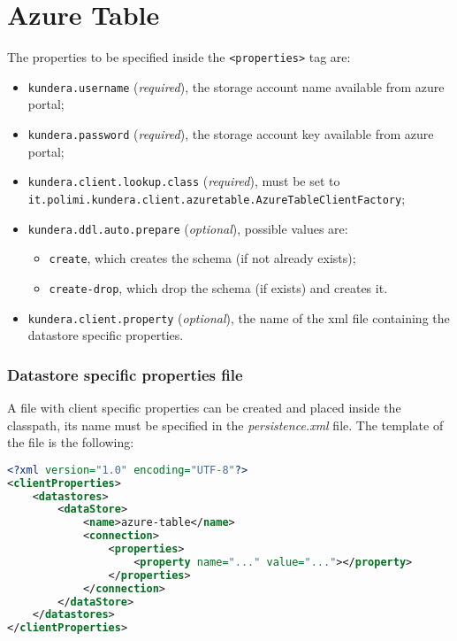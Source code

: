 \section{Azure Table}
\label{appendix:table-config}
The properties to be specified inside the \texttt{<properties>} tag are:
\begin{itemize}
\item \texttt{kundera.username} (\textit{required}), the storage account name available from azure portal;
\item \texttt{kundera.password} (\textit{required}), the storage account key available from azure portal;
\item \texttt{kundera.client.lookup.class} (\textit{required}), must be set to\\\texttt{it.polimi.kundera.client.azuretable.AzureTableClientFactory};
\item \texttt{kundera.ddl.auto.prepare} (\textit{optional}), possible values are:
\begin{itemize}
\item \texttt{create}, which creates the schema (if not already exists);
\item \texttt{create-drop}, which drop the schema (if exists) and creates it.
\end{itemize}
\item \texttt{kundera.client.property} (\textit{optional}), the name of the xml file containing the datastore specific properties.
\end{itemize}

\subsubsection{Datastore specific properties file}
A file with client specific properties can be created and placed inside the classpath, its name must be specified in the \textit{persistence.xml} file.
The template of the file is the following:

\begin{lstlisting}[language=XML, caption=Azure Tables - datastore specific configuration]
<?xml version="1.0" encoding="UTF-8"?>
<clientProperties>
    <datastores>
        <dataStore>
            <name>azure-table</name>
            <connection>
                <properties>
                    <property name="..." value="..."></property>
                </properties>
            </connection>
        </dataStore>
    </datastores>
</clientProperties>
\end{lstlisting}

